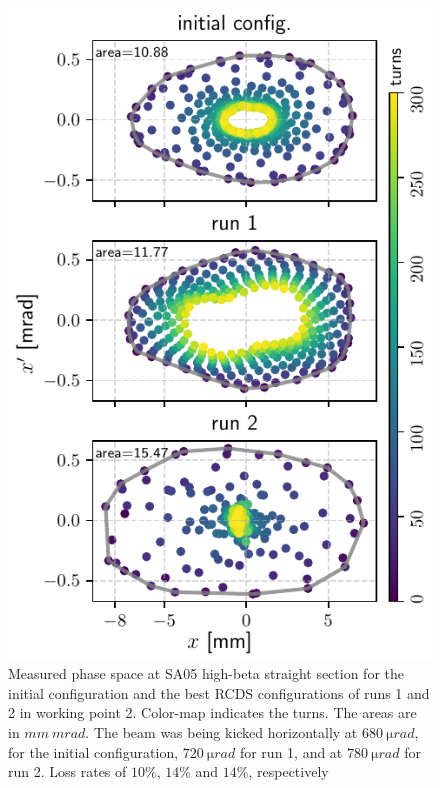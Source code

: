 \documentclass[a4paper,
               keeplastbox,   %
               ]{jacow}
\begin{document}
\begin{figure}
   \includegraphics[width=\columnwidth]{new_tunes_phase_and_areas.pdf}
   \caption{Measured phase space at SA05 high-beta straight section for the initial configuration and the best RCDS configurations of runs 1 and 2 in working point 2. Color-map indicates the turns. The areas are in $\unit{mm}~\unit{mrad}$. The beam was being kicked horizontally at $680~\unit{\micro rad}$, for the initial configuration, $720~\unit{\micro rad}$ for run 1, and at $780~\unit{\micro rad}$ for run 2. Loss rates of $10\%$, $14\%$ and $14\%$, respectively}
   \label{fig:newtunes_phase}
\end{figure}
\end{document}
